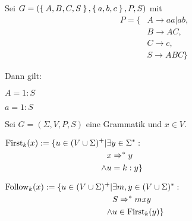 \begin{beispiel}[$k$-Präfixe]
    Sei $G = (\Set{A, B, C, S}, \Set{a, b, c}, P, S)$ mit
    \begin{align*}
        P = \{ &A \rightarrow aa | ab, \\
               &B \rightarrow AC,\\
               &C \rightarrow c,\\
               &S \rightarrow ABC\}
    \end{align*}

    Dann gilt:
    \begin{bspenum}
        \item $A = 1 : S$
        \item $a = 1 : S$
    \end{bspenum}

\end{beispiel}

\begin{definition}%
    Sei $G = (\Sigma, V, P, S)$ eine Grammatik und $x \in V$.

    \begin{defenum}
        \item $\begin{aligned}[t]\operatorname{First}_k (x) := \{u \in (V \cup \Sigma)^+ | &\exists y \in \Sigma^*:\\
              &x \Rightarrow^* y\\
        \land &u = k : y \}\end{aligned}$
        \item $\begin{aligned}[t]\operatorname{Follow}_k(x) := \{u \in (V \cup \Sigma)^+ | &\exists m, y \in (V \cup \Sigma)^* :\\
              &S \Rightarrow^* mxy\\
        \land &u \in \operatorname{First}_k(y)\}\end{aligned}$
    \end{defenum}
\end{definition}

